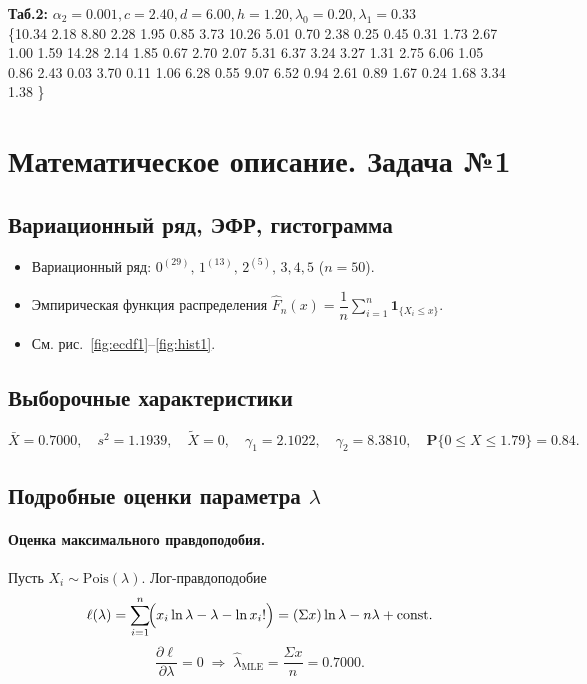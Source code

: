\documentclass[areasetadvanced]{scrartcl}
\begin{document}
\textbf{Таб.2: } $\alpha_2 = 0.001, c = 2.40, d = 6.00,h = 1.20, \lambda_0 = 0.20, \lambda_1 = 0.33$\\
\{10.34 2.18 8.80 2.28 1.95 0.85 3.73 10.26 5.01 0.70 2.38 0.25 0.45 0.31 1.73 2.67 1.00 1.59 14.28 2.14 1.85 0.67 2.70 2.07 5.31 6.37 3.24 3.27 1.31 2.75 6.06 1.05 0.86 2.43 0.03 3.70 0.11 1.06 6.28 0.55 9.07 6.52 0.94 2.61 0.89 1.67 0.24 1.68 3.34 1.38 \}

\newpage
\section{Математическое описание. Задача №1}
\subsection{Вариационный ряд, ЭФР, гистограмма}
\begin{itemize}
  \item Вариационный ряд:
        \(0^{(29)},\,1^{(13)},\,2^{(5)},\,3,4,5\) (\(n=50\)).
  \item Эмпирическая функция распределения
        \(\widehat F_n(x)=\dfrac1n\sum_{i=1}^{n}\mathbf 1_{\{X_i\le x\}}\).
  \item См. рис.~\ref{fig:ecdf1}–\ref{fig:hist1}.
\end{itemize}

\subsection{Выборочные характеристики}
\[
\bar X=0.7000,\quad
s^{2}=1.1939,\quad
\tilde X=0,\quad
\gamma_1=2.1022,\quad
\gamma_2=8.3810,\quad
\mathbf P\!\bigl\{0\le X\le1.79\bigr\}=0.84.
\]


\subsection{Подробные оценки параметра \(\lambda\)}
\paragraph{Оценка максимального правдоподобия.}
Пусть \(X_i\sim\mathrm{Pois}(\lambda)\). Лог-правдоподобие
\[
\ell(\lambda)=\sum_{i=1}^{n}\!\Bigl(x_i\ln\lambda-\lambda-\ln x_i!\Bigr)
             =(\Sigma x)\ln\lambda-n\lambda+\text{const}.
\]
\[
\frac{\partial\ell}{\partial\lambda}=0
\;\Longrightarrow\;
\hat\lambda_{\text{MLE}}=\frac{\Sigma x}{n}=0.7000.
\]
\end{document}
